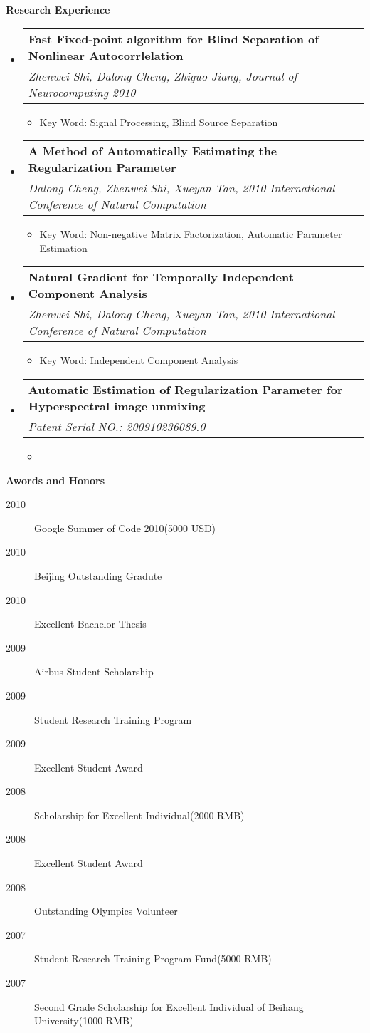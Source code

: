 \documentclass[letterpaper,11pt]{article}
\makeatletter
\newcommand{\resitem}[1]{\item #1 \vspace{-2pt}}
\newcommand{\resheading}[1]{{\large \colorbox{mygrey}{\begin{minipage}{\textwidth}{\textbf{#1 \vphantom{p\^{E}}}}\end{minipage}}}}
\newcommand{\ressubheading}[4]{
\begin{tabular*}{6.5in}{l@{\extracolsep{\fill}}r}
		\textbf{#1} & #2 \\
		\textit{#3} & \textit{#4} \\
\end{tabular*}\vspace{-6pt}}
\makeatother
\begin{document}
\resheading{Research Experience}
	\begin{itemize}
		\item 
			\ressubheading{Fast Fixed-point algorithm for Blind Separation of Nonlinear Autocorrlelation}{}{Zhenwei Shi, Dalong Cheng, Zhiguo Jiang, Journal of Neurocomputing 2010}{}
            { \footnotesize
				\begin{itemize}
					\resitem{Key Word: Signal Processing, Blind Source Separation}
				\end{itemize}
			}
		\item
			\ressubheading{A Method of Automatically Estimating the Regularization Parameter
}{}{Dalong Cheng, Zhenwei Shi, Xueyan Tan, 2010 International Conference of Natural Computation}{}
				{ \footnotesize
				\begin{itemize}
					\resitem{Key Word: Non-negative Matrix Factorization, Automatic Parameter Estimation}
				\end{itemize}
          		}
		\item 
			\ressubheading{Natural Gradient for Temporally Independent Component Analysis}{}{Zhenwei Shi, Dalong Cheng, Xueyan Tan, 2010 International Conference of Natural Computation}{}
				{ \footnotesize
				\begin{itemize}
					\resitem{Key Word: Independent Component Analysis}
				\end{itemize}
				}

		\item 
			\ressubheading{Automatic Estimation of Regularization Parameter for Hyperspectral image unmixing
}{}{Patent Serial NO.: 200910236089.0}{}
				{ \footnotesize
				\begin{itemize}
					\resitem{}
				\end{itemize}
				}

	\end{itemize}  %

\resheading{{Awords and Honors}}
	\begin{description}
        \item[2010] {Google Summer of Code 2010(5000 USD)}
        \item[2010] {Beijing Outstanding Gradute}
	    \item[2010] {Excellent Bachelor Thesis}
        \item[2009] {Airbus Student Scholarship}
        \item[2009] {Student Research Training Program}
        \item[2009] {Excellent Student Award}
        \item[2008] {Scholarship for Excellent Individual(2000 RMB)}
        \item[2008] {Excellent Student Award}
        \item[2008] {Outstanding Olympics Volunteer}
        \item[2007] {Student Research Training Program Fund(5000 RMB)}
        \item[2007] {Second Grade Scholarship for Excellent Individual of Beihang University(1000 RMB)}
	
	\end{description}
    
\end{document}
